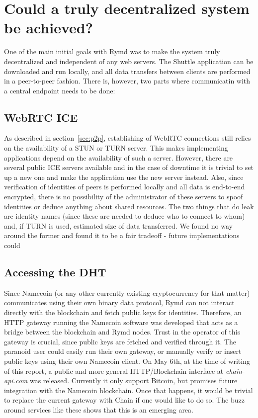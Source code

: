 
\section{Could a truly decentralized system be achieved?}
One of the main initial goals with Rymd was to make the system truly decentralized and independent of any web servers. The Shuttle application can be downloaded and run locally, and all data transfers between clients are performed in a peer-to-peer fashion. There is, however, two parts where communicatin with a central endpoint needs to be done:
\subsection{WebRTC ICE}
As described in section~\ref{sec:p2p}, establishing of WebRTC connections still relies on the availability of a STUN or TURN server. This makes implementing applications depend on the availability of such a server. However, there are several public ICE servers available and in the case of downtime it is trivial to set up a new one and make the application use the new server instead. Also, since verification of identities of peers is performed locally and all data is end-to-end encrypted, there is no possibility of the administrator of these servers to spoof identities or deduce anything about shared resources. The two things that do leak are identity names (since these are needed to deduce who to connect to whom) and, if TURN is used, estimated size of data transferred. We found no way around the former and found it to be a fair tradeoff - future implementations could 

\subsection{Accessing the DHT}
Since Namecoin (or any other currently existing cryptocurrency for that matter) communicates using their own binary data protocol\cite{BitcoinSource:2014:Online}, Rymd can not interact directly with the blockchain and fetch public keys for identities. Therefore, an HTTP gateway running the Namecoin software was developed that acts as a bridge between the blockchain and Rymd nodes. Trust in the operator of this gateway is crucial, since public keys are fetched and verified through it. The paranoid user could easily run their own gateway, or manually verify or insert public keys using their own Namecoin client. On May 6th, at the time of writing of this report, a public and more general HTTP/Blockchain interface at \emph{chain-api.com}\cite{Chain:2014:Online} was released. Currently it only support Bitcoin, but promises future integration with the Namecoin blockchain. Once that happens, it would be trivial to replace the current gateway with Chain if one would like to do so. The buzz around services like these shows that this is an emerging area.

